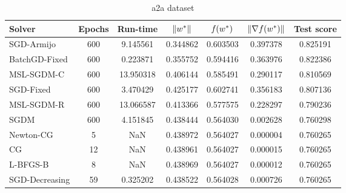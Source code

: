 \begin{table}
\caption{a2a dataset}
\label{tab:a2a-tab}
\centering
\begin{tabular}{lS[drop-zero-decimal]S[round-precision=4]S[round-precision=6]S[round-precision=6]S[exponent-mode=scientific]S[round-precision=6]}
\toprule
Solver & {Epochs} & {Run-time} & {$\lVert w^\ast\rVert$} & {$\operatorname*{\mathit{f}}(w^\ast)$} & {$\lVert\nabla f(w^\ast)\rVert$} & {Test score} \\
\midrule
SGD-Armijo & 600 & 9.145561 & 0.344862 & 0.603503 & 0.397378 & 0.825191 \\
BatchGD-Fixed & 600 & 0.223871 & 0.355752 & 0.594416 & 0.363976 & 0.822386 \\
MSL-SGDM-C & 600 & 13.950318 & 0.406144 & 0.585491 & 0.290117 & 0.810569 \\
SGD-Fixed & 600 & 3.470429 & 0.425177 & 0.602741 & 0.356183 & 0.807136 \\
MSL-SGDM-R & 600 & 13.066587 & 0.413366 & 0.577575 & 0.228297 & 0.790236 \\
SGDM & 600 & 4.151845 & 0.438444 & 0.564030 & 0.002628 & 0.760298 \\
Newton-CG & 5 & NaN & 0.438972 & 0.564027 & 0.000004 & 0.760265 \\
CG & 12 & NaN & 0.438961 & 0.564027 & 0.000015 & 0.760265 \\
L-BFGS-B & 8 & NaN & 0.438969 & 0.564027 & 0.000012 & 0.760265 \\
SGD-Decreasing & 59 & 0.325202 & 0.438522 & 0.564028 & 0.000726 & 0.760265 \\
\bottomrule
\end{tabular}
\end{table}

